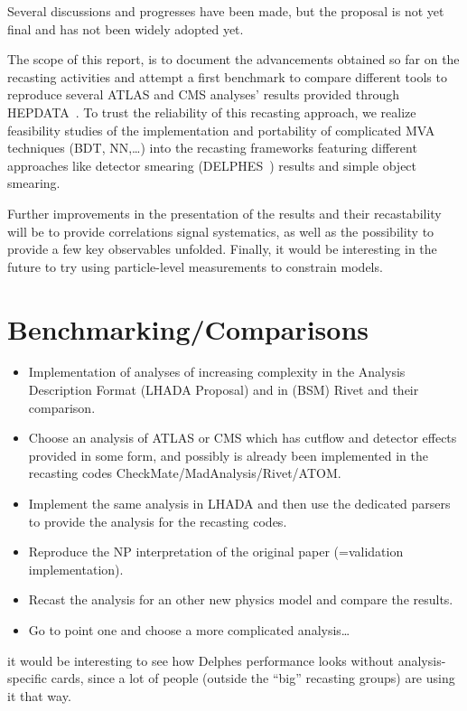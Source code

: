 \documentclass[11pt]{cernrep}
\begin{document}
Several discussions and progresses have been made, but the proposal is not yet final and has not been widely adopted yet.

The scope of this report, is to document the advancements obtained so far
on the recasting activities and attempt a first benchmark to compare different tools
to reproduce several ATLAS and CMS analyses' results provided through HEPDATA~\cite{Maguire:2017ypu}.
To trust the reliability of this recasting approach, we realize feasibility studies of the implementation and portability of complicated MVA techniques (BDT, NN,…) into the recasting frameworks featuring different approaches like detector smearing (DELPHES~\cite{deFavereau:2013fsa}) results and simple object smearing.

Further improvements in the presentation of the results and their recastability will be to provide correlations signal systematics, as well as the possibility to provide a few key observables unfolded. Finally, it would be interesting in the future to try using particle-level measurements to constrain models.


\section{Benchmarking/Comparisons}

\begin{itemize}
  \item Implementation of analyses of increasing complexity in the Analysis Description Format (LHADA Proposal) and in (BSM) Rivet and their comparison.
  \item Choose an analysis of ATLAS or CMS which has cutflow and detector effects provided in some form, and possibly is already been implemented in the recasting codes CheckMate/MadAnalysis/Rivet/ATOM.
  \item Implement the same analysis in LHADA and then use the dedicated parsers to provide the analysis for the recasting codes.
  \item Reproduce the NP interpretation of the original paper (=validation implementation).
  \item Recast the analysis for an other new physics model and compare the results.
  \item Go to point one and choose a more complicated analysis…
\end{itemize}
it would be interesting to see how Delphes performance looks without analysis-specific cards, since a lot of people (outside the “big” recasting groups) are using it that way.
\end{document}
